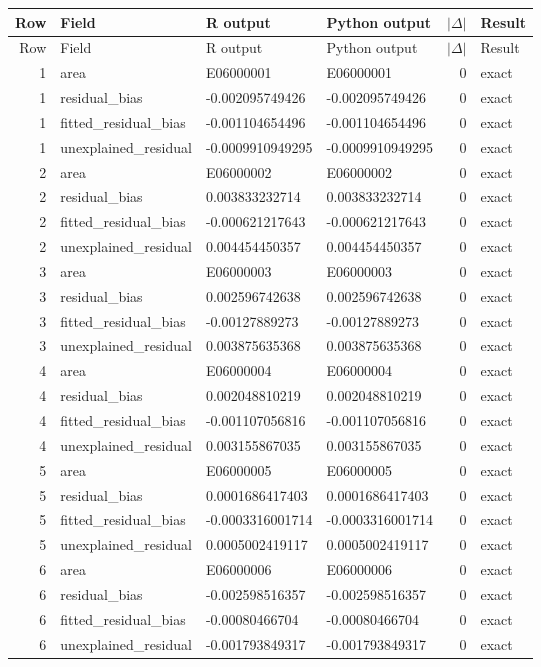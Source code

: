 \documentclass[10pt]{article}
\begin{document}
\small
\begin{longtable}{@{}r p{}p{}p{}rl@{}}
\toprule
Row & Field & R output & Python output & $|\Delta|$ & Result \\
\midrule
\endfirsthead
\toprule
Row & Field & R output & Python output & $|\Delta|$ & Result \\
\midrule
\endhead
1 & area & E06000001 & E06000001 & 0 & exact \\
1 & residual\_\allowbreak{}bias & -0.002095749426 & -0.002095749426 & 0 & exact \\
1 & fitted\_\allowbreak{}residual\_\allowbreak{}bias & -0.001104654496 & -0.001104654496 & 0 & exact \\
1 & unexplained\_\allowbreak{}residual & -0.0009910949295 & -0.0009910949295 & 0 & exact \\
2 & area & E06000002 & E06000002 & 0 & exact \\
2 & residual\_\allowbreak{}bias & 0.003833232714 & 0.003833232714 & 0 & exact \\
2 & fitted\_\allowbreak{}residual\_\allowbreak{}bias & -0.000621217643 & -0.000621217643 & 0 & exact \\
2 & unexplained\_\allowbreak{}residual & 0.004454450357 & 0.004454450357 & 0 & exact \\
3 & area & E06000003 & E06000003 & 0 & exact \\
3 & residual\_\allowbreak{}bias & 0.002596742638 & 0.002596742638 & 0 & exact \\
3 & fitted\_\allowbreak{}residual\_\allowbreak{}bias & -0.00127889273 & -0.00127889273 & 0 & exact \\
3 & unexplained\_\allowbreak{}residual & 0.003875635368 & 0.003875635368 & 0 & exact \\
4 & area & E06000004 & E06000004 & 0 & exact \\
4 & residual\_\allowbreak{}bias & 0.002048810219 & 0.002048810219 & 0 & exact \\
4 & fitted\_\allowbreak{}residual\_\allowbreak{}bias & -0.001107056816 & -0.001107056816 & 0 & exact \\
4 & unexplained\_\allowbreak{}residual & 0.003155867035 & 0.003155867035 & 0 & exact \\
5 & area & E06000005 & E06000005 & 0 & exact \\
5 & residual\_\allowbreak{}bias & 0.0001686417403 & 0.0001686417403 & 0 & exact \\
5 & fitted\_\allowbreak{}residual\_\allowbreak{}bias & -0.0003316001714 & -0.0003316001714 & 0 & exact \\
5 & unexplained\_\allowbreak{}residual & 0.0005002419117 & 0.0005002419117 & 0 & exact \\
6 & area & E06000006 & E06000006 & 0 & exact \\
6 & residual\_\allowbreak{}bias & -0.002598516357 & -0.002598516357 & 0 & exact \\
6 & fitted\_\allowbreak{}residual\_\allowbreak{}bias & -0.00080466704 & -0.00080466704 & 0 & exact \\
6 & unexplained\_\allowbreak{}residual & -0.001793849317 & -0.001793849317 & 0 & exact \\
\bottomrule
\end{longtable}
\end{document}

